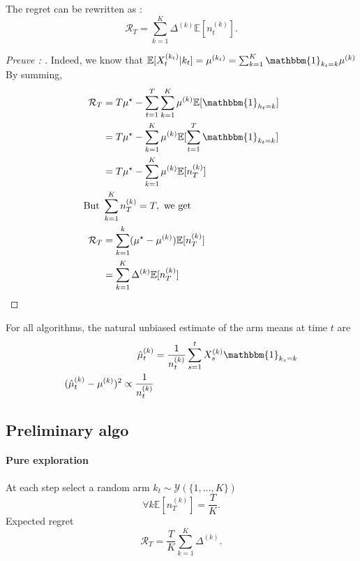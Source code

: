 The regret can be rewritten as : 
\[
    \mathcal{R}_T = \sum_{k=1}^{K} \Delta^{(k)} \mathbb{E}[n_t^{(k)}]
.\]
\begin{proof}[Preuve : ]
    Indeed, we know that $\mathbb{E}[X_t^{(k_t)}|k_t] = \mu ^{(k_t)} = \sum_{k=1}^{K} \mathbbm{1}_{k_t=k} \mu ^{(k)}$
    By summing,
    \begin{align*}
        \mathcal{R}_T 
            &= T \mu ^\star - \sum_{t=1}^{T} \sum_{k=1}^{K} \mu ^{(k)} \mathbb{E}[ \mathbbm{1}_{h_t = k}] \\
            &= T \mu ^\star - \sum_{k=1}^{K} \mu ^{(k)} \mathbb{E}[ \sum_{t=1}^{T} \mathbbm{1}_{k_t = k}] \\
            &= T \mu ^\star - \sum_{k=1}^{K} \mu ^{(k)} \mathbb{E}[ n_T^{(k)} ] \\
        \text{But }
            &\sum_{k=1}^{K} n_T^{(k)} = T, \text{ we get } \\
        \mathcal{R}_T  
            &= \sum_{k=1}^{k} (\mu ^\star - \mu ^{(k)}) \mathbb{E}[ n_T^{(k)} ] \\
            &= \sum_{k=1}^{K} \Delta ^{(k)} \mathbb{E}[ n_T^{(k)} ]
    \end{align*}
\end{proof}
For all algorithms, the natural unbiased estimate of the arm means at time $ t $ are
\begin{align*}
    \hat{\mu }_t ^{(k)} &= \frac{1}{n_t ^{(k)}} \sum_{s=1}^{t} X_s^{(k)} \mathbbm{1}_{k_s = k} \\
    (\hat{\mu }_t ^{(k)} - \mu ^{(k)})^2 \propto \frac{1}{n_t^{(k)}}
\end{align*}

\subsection{Preliminary algo}
\paragraph{Pure exploration}
At each step select a random arm $ k_t \sim \mathcal{Y} ( \{1, \dots, K\}) $ 
\[
    \forall k \mathbb{E}[ n_T^{(k)} ] = \frac{T}{K}
.\]
Expected regret 
\[
    \mathcal{R}_T = \frac{T}{K} \sum_{k=1}^{K}\Delta ^{(k)}
.\]

